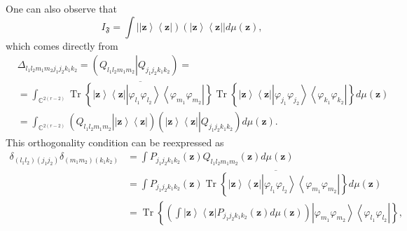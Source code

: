 \documentclass[aps,preprint]{revtex4}%
\begin{document}
One can also observe that
\begin{equation}
I_{\mathfrak{F}}=\int\left\vert \left\vert \mathbf{z}\right\rangle
\left\langle \mathbf{z}\right\vert \right)  \left(  \left\vert \mathbf{z}%
\right\rangle \left\langle \mathbf{z}\right\vert \right\vert d\mu\left(
\mathbf{z}\right)  ,
\end{equation}
which comes directly from
\begin{align}
&  \Delta_{l_{1}l_{2}m_{1}m_{2}j_{1}j_{2}k_{1}k_{2}}=\left(  Q_{l_{1}%
l_{2}m_{1}m_{2}}\left\vert Q_{j_{1}j_{2}k_{1}k_{2}}\right.  \right)
=\nonumber\\
&  =\int_{\mathbb{C}^{2\left(  r-2\right)  }}\overline{\operatorname*{Tr}%
\left\{  \left\vert \mathbf{z}\right\rangle \left\langle \mathbf{z}\right\vert
\left\vert \varphi_{l_{1}}\varphi_{l_{2}}\right\rangle \left\langle
\varphi_{m_{1}}\varphi_{m_{2}}\right\vert \right\}  }\operatorname*{Tr}%
\left\{  \left\vert \mathbf{z}\right\rangle \left\langle \mathbf{z}\right\vert
\left\vert \varphi_{j_{1}}\varphi_{j_{2}}\right\rangle \left\langle
\varphi_{k_{1}}\varphi_{k_{2}}\right\vert \right\}  d\mu\left(  \mathbf{z}%
\right) \nonumber\\
&  =\int_{\mathbb{C}^{2\left(  r-2\right)  }}\left(  \left.  Q_{l_{1}%
l_{2}m_{1}m_{2}}\right\vert \left\vert \mathbf{z}\right\rangle \left\langle
\mathbf{z}\right\vert \right)  \left(  \left\vert \mathbf{z}\right\rangle
\left\langle \mathbf{z}\right\vert \left\vert Q_{j_{1}j_{2}k_{1}k_{2}}\right.
\right)  d\mu\left(  \mathbf{z}\right)  .
\end{align}
This orthogonality condition can be reexpressed as
\begin{align}
\delta_{\left(  l_{1}l_{2}\right)  \left(  j_{1}j_{2}\right)  }\delta_{\left(
m_{1}m_{2}\right)  \left(  k_{1}k_{2}\right)  }  &  =\int P_{j_{1}j_{2}%
k_{1}k_{2}}\left(  \mathbf{z}\right)  Q_{l_{1}l_{2}m_{1}m_{2}}\left(
\mathbf{z}\right)  d\mu\left(  \mathbf{z}\right) \nonumber\\
&  =\int P_{j_{1}j_{2}k_{1}k_{2}}\left(  \mathbf{z}\right)  \overline
{\operatorname*{Tr}\left\{  \left\vert \mathbf{z}\right\rangle \left\langle
\mathbf{z}\right\vert \left\vert \varphi_{l_{1}}\varphi_{l_{2}}\right\rangle
\left\langle \varphi_{m_{1}}\varphi_{m_{2}}\right\vert \right\}  }d\mu\left(
\mathbf{z}\right) \nonumber\\
&  =\operatorname*{Tr}\left\{  \left(  \int\left\vert \mathbf{z}\right\rangle
\left\langle \mathbf{z}\right\vert P_{j_{1}j_{2}k_{1}k_{2}}\left(
\mathbf{z}\right)  d\mu\left(  \mathbf{z}\right)  \right)  \left\vert
\varphi_{m_{1}}\varphi_{m_{2}}\right\rangle \left\langle \varphi_{l_{1}%
}\varphi_{l_{2}}\right\vert \right\}  ,
\end{align}
\end{document}
